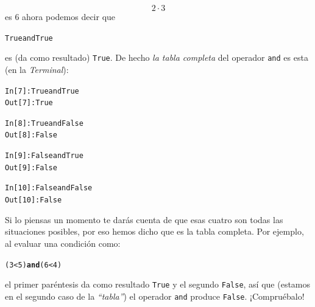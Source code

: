 \documentclass[10pt,a4paper]{article}\usepackage[]{graphicx}\usepackage[]{color}
\makeatletter
\newcommand{\hlkwd}[1]{\textcolor[rgb]{0.737,0.353,0.396}{\textbf{#1}}}%
\newenvironment{kframe}{%
 \def\at@end@of@kframe{}%
 \ifinner\ifhmode%
  \def\at@end@of@kframe{\end{minipage}}%
  \begin{minipage}{\columnwidth}%
 \fi\fi%
 \def\FrameCommand##1{\hskip\@totalleftmargin \hskip-\fboxsep
 \colorbox{shadecolor}{##1}\hskip-\fboxsep
     \hskip-\linewidth \hskip-\@totalleftmargin \hskip\columnwidth}%
 \MakeFramed {\advance\hsize-\width
   \@totalleftmargin\z@ \linewidth\hsize
   \@setminipage}}%
 {\par\unskip\endMakeFramed%
 \at@end@of@kframe}
\newenvironment{knitrout}{}{} %
\makeatother
\begin{document}
\[
2 \cdot 3
\]
es 6 ahora podemos decir que
\begin{knitrout}
\color{fgcolor}\begin{kframe}
\begin{alltt}
True and True
\end{alltt}
\end{kframe}
\end{knitrout}
es (da como resultado) {\tt True}. De hecho {\em la tabla completa} del operador {\tt and} es esta (en la {\em Terminal}):
\begin{knitrout}
\color{fgcolor}\begin{kframe}
\begin{alltt}
In [7]: True and True
Out[7]: True

In [8]: True and False
Out[8]: False

In [9]: False and True
Out[9]: False

In [10]: False and False
Out[10]: False
\end{alltt}
\end{kframe}
\end{knitrout}
Si lo piensas un momento te darás cuenta de que esas cuatro son todas las situaciones posibles, por eso hemos dicho que es la tabla completa. Por ejemplo, al evaluar una condición como:
\begin{knitrout}
\color{fgcolor}\begin{kframe}
\begin{alltt}
 (3 < 5) \hlkwd{and} (6 < 4)
\end{alltt}
\end{kframe}
\end{knitrout}
el primer paréntesis da como resultado {\tt True} y el segundo {\tt False}, así que (estamos en el segundo caso de la {\em ``tabla''}) el operador {\tt and} produce {\tt False}. ¡Compruébalo!
\end{document}
